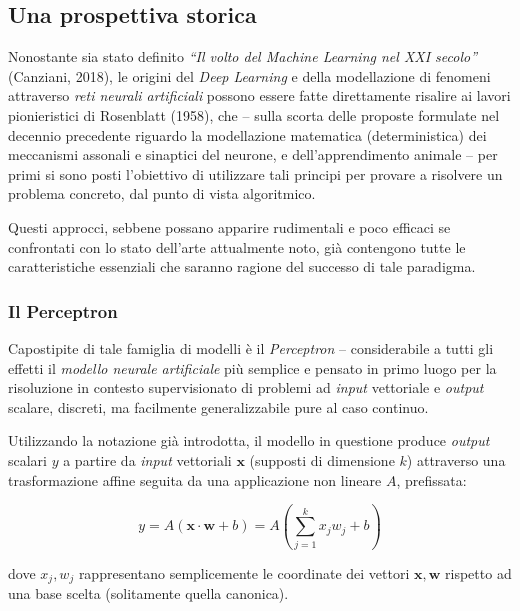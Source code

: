 \documentclass[a4paper, twoside]{article}
\begin{document}
\subsection{Una prospettiva storica}

Nonostante sia stato definito \textit{``Il volto del Machine Learning nel XXI secolo''} (Canziani, 2018), le origini del \textit{Deep Learning} e della modellazione di fenomeni attraverso \textit{reti neurali artificiali} possono essere fatte direttamente risalire ai lavori pionieristici di Rosenblatt (1958), che -- sulla scorta delle proposte formulate nel decennio precedente riguardo la modellazione matematica (deterministica) dei meccanismi assonali e sinaptici del neurone, e dell'apprendimento animale -- per primi si sono posti l'obiettivo di utilizzare tali principi per provare a risolvere un problema concreto, dal punto di vista algoritmico.

Questi approcci, sebbene possano apparire rudimentali e poco efficaci se confrontati con lo stato dell'arte attualmente noto, già contengono tutte le caratteristiche essenziali che saranno ragione del successo di tale paradigma.

\subsubsection{Il Perceptron}

Capostipite di tale famiglia di modelli è il \textit{Perceptron} -- considerabile a tutti gli effetti il \textit{modello neurale artificiale} più semplice e pensato in primo luogo per la risoluzione in contesto supervisionato di problemi ad \textit{input} vettoriale e \textit{output} scalare, discreti, ma facilmente generalizzabile pure al caso continuo.

Utilizzando la notazione già introdotta, il modello in questione produce \textit{output} scalari $y$ a partire da \textit{input} vettoriali $\boldsymbol{x}$ (supposti di dimensione $k$) attraverso una trasformazione affine seguita da una applicazione non lineare $A$, prefissata:

$$
y = A \left( \boldsymbol{x} \cdot \boldsymbol{w} + b \right) = A \left( \sum_{j=1}^{k}{x_j w_j + b} \right)
$$

dove $x_j, w_j$ rappresentano semplicemente le coordinate dei vettori $\boldsymbol{x}, \boldsymbol{w}$ rispetto ad una base scelta (solitamente quella canonica).
\end{document}
